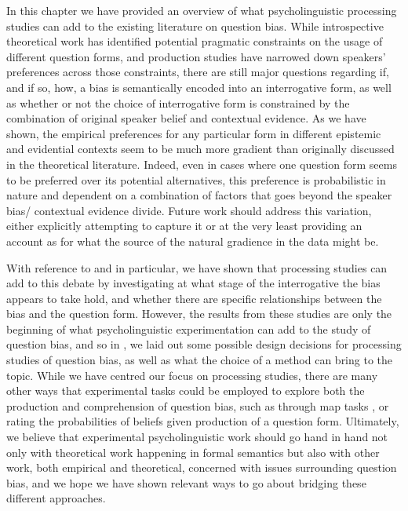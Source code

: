 \documentclass[output=paper,colorlinks,citecolor=brown]{langscibook}
\begin{document}
In this chapter we have provided an overview of what psycholinguistic processing studies can add to the existing literature on question bias. While introspective theoretical work has identified potential pragmatic constraints on the usage of different question forms, and production studies have narrowed down speakers' preferences across those constraints, there are still major questions regarding if, and if so, how, a bias is semantically encoded into an interrogative form, as well as whether or not the choice of interrogative form is constrained by the combination of original speaker belief and contextual evidence. As we have shown, the empirical preferences for any particular form in different epistemic and evidential contexts seem to be much more gradient than originally discussed in the theoretical literature. Indeed, even in cases where one question form seems to be preferred over its potential alternatives, this preference is probabilistic in nature and dependent on a combination of factors that goes beyond the speaker bias/ contextual evidence divide. Future work should address this variation, either explicitly attempting to capture it or at the very least providing an account as for what the source of the natural gradience in the data might be. 

With reference to \citet{macuch_processing_inprep} and \citet{tian_representing_2021} in particular, we have shown that processing studies can add to this debate by investigating at what stage of the interrogative the bias appears to take hold, and whether there are specific relationships between the bias and the question form. However, the results from these studies are only the beginning of what psycholinguistic experimentation can add to the study of question bias, and so in , we laid out some possible design decisions for processing studies of question bias, as well as what the choice of a method can bring to the topic. While we have centred our focus on processing studies, there are many other ways that experimental tasks could be employed to explore both the production and comprehension of question bias, such as through map tasks \citep{Anderson1991}, or rating the probabilities of beliefs \citep{Tonhauser2016, Degen2019} given production of a question form. Ultimately, we believe that experimental psycholinguistic work should go hand in hand not only with theoretical work happening in formal semantics but also with other work, both empirical and theoretical, concerned with issues surrounding question bias, and we hope we have shown relevant ways to go about bridging these different approaches.
\end{document}
